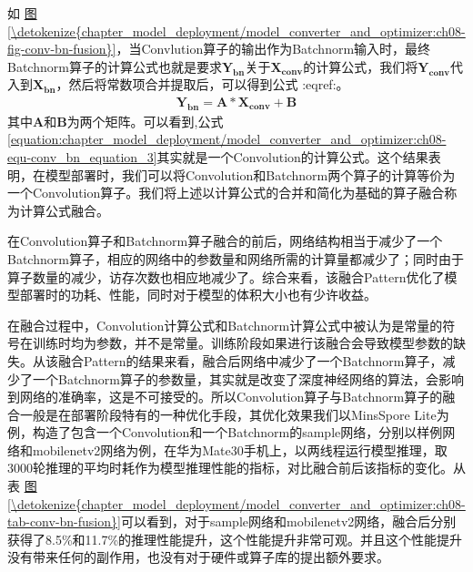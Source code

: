 \documentclass[letterpaper,10pt,english]{sphinxmanual}
\begin{document}
\sphinxAtStartPar
如
\hyperref[\detokenize{chapter_model_deployment/model_converter_and_optimizer:ch08-fig-conv-bn-fusion}]{图\ref{\detokenize{chapter_model_deployment/model_converter_and_optimizer:ch08-fig-conv-bn-fusion}}}，当Convlution算子的输出作为Batchnorm输入时，最终Batchnorm算子的计算公式也就是要求\(\pmb{Y_{bn}}\)关于\(\pmb{X_{conv}}\)的计算公式，我们将\(\pmb{Y_{conv}}\)代入到\(\pmb{X_{bn}}\)，然后将常数项合并提取后，可以得到公式
:eqref:。
\begin{equation}\label{equation:chapter_model_deployment/model_converter_and_optimizer:ch08-equ-conv_bn_equation_3}
\begin{split}\pmb{Y_{bn}}=\pmb{A}*\pmb{X_{conv}}+\pmb{B}\end{split}
\end{equation}
\sphinxAtStartPar
其中\(\pmb{A}\)和\(\pmb{B}\)为两个矩阵。可以看到,公式
\eqref{equation:chapter_model_deployment/model_converter_and_optimizer:ch08-equ-conv_bn_equation_3}其实就是一个Convolution的计算公式。这个结果表明，在模型部署时，我们可以将Convolution和Batchnorm两个算子的计算等价为一个Convolution算子。我们将上述以计算公式的合并和简化为基础的算子融合称为计算公式融合。

\sphinxAtStartPar
在Convolution算子和Batchnorm算子融合的前后，网络结构相当于减少了一个Batchnorm算子，相应的网络中的参数量和网络所需的计算量都减少了；同时由于算子数量的减少，访存次数也相应地减少了。综合来看，该融合Pattern优化了模型部署时的功耗、性能，同时对于模型的体积大小也有少许收益。

\sphinxAtStartPar
在融合过程中，Convolution计算公式和Batchnorm计算公式中被认为是常量的符号在训练时均为参数，并不是常量。训练阶段如果进行该融合会导致模型参数的缺失。从该融合Pattern的结果来看，融合后网络中减少了一个Batchnorm算子，减少了一个Batchnorm算子的参数量，其实就是改变了深度神经网络的算法，会影响到网络的准确率，这是不可接受的。所以Convolution算子与Batchnorm算子的融合一般是在部署阶段特有的一种优化手段，其优化效果我们以MinsSpore
Lite为例，构造了包含一个Convolution和一个Batchnorm的sample网络，分别以样例网络和mobilenet\sphinxhyphen{}v2网络为例，在华为Mate30手机上，以两线程运行模型推理，取3000轮推理的平均时耗作为模型推理性能的指标，对比融合前后该指标的变化。从表
\hyperref[\detokenize{chapter_model_deployment/model_converter_and_optimizer:ch08-tab-conv-bn-fusion}]{图\ref{\detokenize{chapter_model_deployment/model_converter_and_optimizer:ch08-tab-conv-bn-fusion}}}可以看到，对于sample网络和mobilenet\sphinxhyphen{}v2网络，融合后分别获得了8.5\%和11.7\%的推理性能提升，这个性能提升非常可观。并且这个性能提升没有带来任何的副作用，也没有对于硬件或算子库的提出额外要求。
\end{document}
